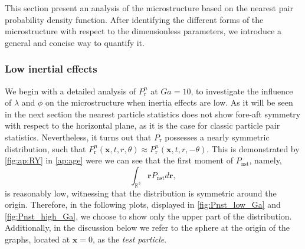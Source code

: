 This section present an analysis of the microstructure based on the nearest pair probability density function. %
After identifying the different forms of the microstructure with respect to the dimensionless parameters, we introduce a general and concise way to quantify it.


\subsubsection*{Low inertial effects }
We begin with a detailed analysis of $P_\text{r}^n$ at $Ga =10$, to investigate the influence of $\lambda$ and $\phi$ on the microstructure when inertia effects are low.
As it will be seen in the next section the nearest particle statistics does not show fore-aft symmetry with respect to the horizontal plane, as it is the case for classic particle pair statistics. 
Nevertheless, it turns out that $P_\text{r}$ possesses a nearly symmetric distribution, such that $P_\text{r}^n(\textbf{x},t,r,\theta)\approx P_\text{r}^n(\textbf{x},t,r,- \theta)$. 
This is demonstrated by \ref{fig:ap:RY} in \ref{ap:age} were we can see that the first moment of $P_\text{nst}$, namely, 
\begin{equation*}
    \int_{\mathbb{R}^3} \textbf{r} P_\text{nst} d\textbf{r},
\end{equation*}
is reasonably low, witnessing that the distribution is symmetric around the origin. 
Therefore, in the following plots, displayed in \ref{fig:Pnst_low_Ga} and \ref{fig:Pnst_high_Ga}, we choose to show only the upper part of the distribution.
Additionally, in the discussion below we refer to the sphere at the origin of the graphs, located at $\textbf{x}=0$, as the \textit{test particle}.%

